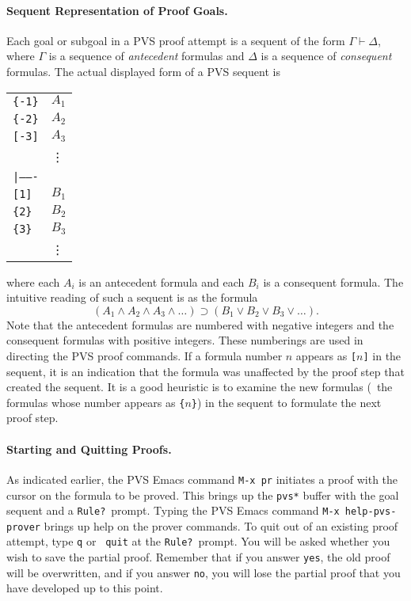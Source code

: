 \paragraph{Sequent Representation of Proof Goals.}
Each goal or subgoal in a PVS proof attempt is a sequent
of the form $\Gamma\vdash\Delta$, where $\Gamma$ is a sequence of
{\em antecedent\/} formulas and $\Delta$ is a 
sequence of {\em consequent\/} formulas.  The actual displayed form of a
PVS sequent is
\begin{center}
\begin{tabular}{ll}
  {\tt \{-1\}} & $A_1$\\
  {\tt \{-2\}} & $A_2$\\
  {\tt [-3]} & $A_3$\\
 & \vdots\\
 \multicolumn{2}{l}{\tt |-------}\\
  {\tt [1]} & $B_1$\\
  {\tt \{2\}} & $B_2$\\
  {\tt \{3\}} & $B_3$\\
 & \vdots
\end{tabular}
\end{center}
where each $A_i$ is an antecedent formula and each $B_i$ is a consequent
formula.  The intuitive reading of such a sequent is as the formula
$$(A_1\wedge A_2 \wedge A_3 \wedge \ldots ) \supset (B_1 \vee B_2 \vee
B_3 \vee \ldots).$$ Note that the antecedent formulas are numbered with
negative integers and the consequent formulas with positive integers.
These numberings are used in directing the PVS proof commands. If a
formula number $n$ appears as {\tt [$n$]} in the sequent, it is an
indication that the formula was unaffected by the proof step that
created the sequent.  It is a good heuristic is to examine the new
formulas (\ie\ the formulas whose number appears as {\tt \{$n$\}}) in
the sequent to formulate the next proof step.


\paragraph{Starting and Quitting Proofs. }

As indicated earlier, the PVS Emacs command {\tt M-x pr} initiates a
proof with the cursor on the formula to be proved.   This brings up the
{\tt *pvs*} buffer with the goal sequent and a {\tt Rule?}\ prompt.
Typing the PVS Emacs command {\tt M-x help-pvs-prover} brings up
help on the prover commands.
To quit out of an existing proof attempt, type {\tt q} or {\tt
quit} at the {\tt Rule?}\ prompt.   You will be asked whether you wish to
save the partial proof.  Remember that if you answer {\tt yes}, the old
proof will be overwritten, and if you answer {\tt no}, you will lose the
partial proof that you have developed up to this point.



